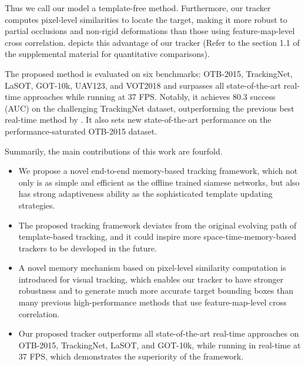 \documentclass[final]{cvpr}
\begin{document}
Thus we call our model a template-free method.
Furthermore, our tracker computes pixel-level similarities to locate the target, making it more robust to partial occlusions and non-rigid deformations than those using feature-map-level cross correlation.
 depicts this advantage of our tracker (Refer to the section 1.1 of the supplemental material for quantitative comparisons).
\par
The proposed method is evaluated on six benchmarks: OTB-2015, TrackingNet, LaSOT, GOT-10k, UAV123, and VOT2018 and surpasses all state-of-the-art real-time approaches while running at 37 FPS.
Notably, it achieves 80.3 success (AUC) on the challenging TrackingNet dataset, outperforming the previous best real-time method by .
It also sets new state-of-the-art performance on the performance-saturated OTB-2015 dataset.

Summarily, the main contributions of this work are fourfold.
\vspace{-0.5em}
\begin{itemize}
\item{We propose a novel end-to-end memory-based tracking framework, which not only is as simple and efficient as the offline trained siamese networks, but also has strong adaptiveness ability as the sophisticated template updating strategies.}
\vspace{-0.5em}
\item{The proposed tracking framework deviates from the original evolving path of template-based tracking, and it could inspire more space-time-memory-based trackers to be developed in the future.}
\vspace{-0.5em}
\item{A novel memory mechanism based on pixel-level similarity computation is introduced for visual tracking, which enables our tracker to have stronger robustness and to generate much more accurate target bounding boxes than many previous high-performance methods that use feature-map-level cross correlation.}
\vspace{-0.5em}
\item Our proposed tracker outperforms all state-of-the-art real-time approaches on OTB-2015, TrackingNet, LaSOT, and GOT-10k, while running in real-time at 37 FPS, which demonstrates the superiority of the framework.
\end{itemize}
\end{document}

